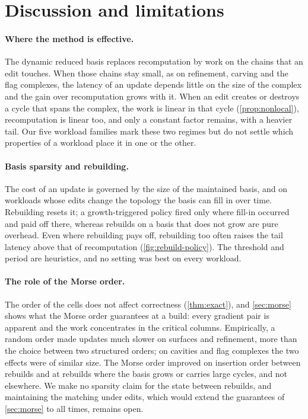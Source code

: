 \section{Discussion and limitations}\label{sec:discussion}

\paragraph{Where the method is effective.}
The dynamic reduced basis replaces recomputation by work on the chains that an
edit touches. When those chains stay small, as on refinement, carving and the
flag complexes, the latency of an update depends little on the size of the
complex and the gain over recomputation grows with it. When an edit creates or
destroys a cycle that spans the complex, the work is linear in that cycle
(\cref{prop:nonlocal}), recomputation is linear too, and only a constant factor
remains, with a heavier tail. Our five workload families mark these two regimes
but do not settle which properties of a workload place it in one or the other.

\paragraph{Basis sparsity and rebuilding.}
The cost of an update is governed by the size of the maintained basis, and on
workloads whose edits change the topology the basis can fill in over time.
Rebuilding resets it; a growth-triggered policy fired only where fill-in
occurred and paid off there, whereas rebuilds on a basis that does not grow are
pure overhead. Even where rebuilding pays off, rebuilding too often raises the
tail latency above that of recomputation (\cref{fig:rebuild-policy}). The
threshold and period are heuristics, and no setting was best on every workload.

\paragraph{The role of the Morse order.}
The order of the cells does not affect correctness (\cref{thm:exact}), and
\cref{sec:morse} shows what the Morse order guarantees at a build: every
gradient pair is apparent and the work concentrates in the critical columns.
Empirically, a random order made updates much slower on surfaces and
refinement, more than the choice between two structured orders; on cavities and
flag complexes the two effects were of similar size. The Morse order improved on
insertion order between rebuilds and at rebuilds where the basis grows or
carries large cycles, and not elsewhere. We
make no sparsity claim for the state between rebuilds, and maintaining the
matching under edits, which would extend the guarantees of \cref{sec:morse} to
all times, remains open.

